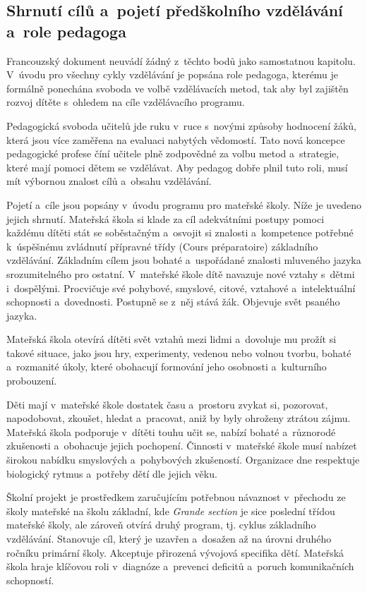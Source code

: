 \subsection{Shrnutí cílů a~pojetí předškolního vzdělávání a~role pedagoga}

	Francouzský dokument neuvádí žádný z~těchto bodů jako samostatnou kapitolu. V~úvodu pro všechny cykly vzdělávání je popsána role pedagoga, kterému je formálně ponechána svoboda ve volbě vzdělávacích metod, tak aby byl zajištěn rozvoj dítěte s~ohledem na cíle vzdělávacího programu.

	Pedagogická svoboda učitelů jde ruku v~ruce s~novými způsoby hodnocení žáků, která jsou více zaměřena na evaluaci nabytých vědomostí. Tato nová koncepce pedagogické profese číní učitele  plně zodpovědné za volbu metod a~strategie, které mají pomoci dětem se vzdělávat. Aby pedagog dobře plnil tuto roli, musí mít výbornou znalost cílů a~obsahu vzdělávání.

	Pojetí a~cíle jsou popsány v~úvodu programu pro mateřské školy. Níže je uvedeno jejich shrnutí.
	Mateřská škola si klade za cíl adekvátními postupy pomoci každému dítěti stát se soběstačným a~osvojit si znalosti a~kompetence potřebné k úspěšnému zvládnutí přípravné třídy (Cours préparatoire) základního vzdělávání. Základním cílem jsou bohaté a~uspořádané znalosti mluveného jazyka srozumitelného pro ostatní. V mateřské škole dítě navazuje nové vztahy s dětmi i~dospělými. Procvičuje své pohybové, smyslové, citové, vztahové a~intelektuální schopnosti a~dovednosti. Postupně se z něj stává žák. Objevuje svět psaného jazyka. 

	Mateřská škola otevírá dítěti svět vztahů mezi lidmi a~dovoluje mu prožít si takové situace, jako jsou hry, experimenty, vedenou nebo volnou tvorbu, bohaté a~rozmanité úkoly, které obohacují formování jeho osobnosti a~kulturního probouzení. 

	Děti mají v mateřské škole dostatek času a~prostoru zvykat si, pozorovat, napodobovat, zkoušet, hledat a~pracovat, aniž by byly ohroženy ztrátou zájmu. Mateřská škola podporuje v dítěti touhu učit se, nabízí bohaté a~různorodé zkušenosti a~obohacuje jejich pochopení. 
	Činnosti v mateřské škole musí nabízet širokou nabídku smyslových a~pohybových zkušeností. Organizace dne respektuje biologický rytmus a~potřeby dětí dle jejich věku. 

	Školní projekt je prostředkem zaručujícím potřebnou návaznost v~přechodu ze školy mateřské na školu základní, kde \textit{Grande section} je sice poslední třídou mateřské školy, ale zároveň otvírá druhý program, tj. cyklus základního vzdělávání. Stanovuje cíl, který je uzavřen a~dosažen až na úrovni druhého ročníku primární školy. Akceptuje přirozená vývojová specifika dětí. Mateřská škola hraje klíčovou roli v diagnóze a~prevenci deficitů a~poruch komunikačních schopností.


